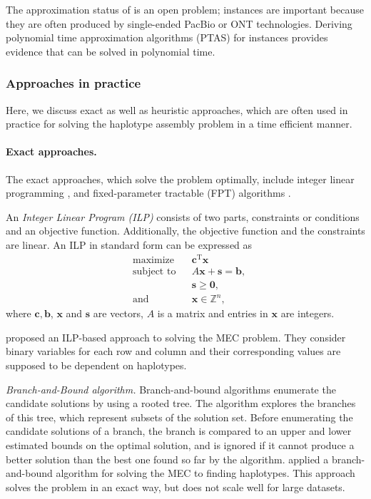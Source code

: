 \begin{gaps}
 The approximation status of \GMEC is an open problem; \GMEC instances are important  because they are often produced by single-ended PacBio or ONT technologies.
 Deriving polynomial time approximation algorithms (PTAS) for \GMEC instances provides evidence that \GMEC can be solved in polynomial time.
 \label{gap:gap1}
\end{gaps}

\subsubsection{Approaches in practice}
Here, we discuss exact as well as heuristic approaches, which are often used in practice for solving the haplotype assembly problem in a time efficient manner.
\paragraph{Exact approaches.} The exact approaches, which solve the problem optimally, include integer linear programming \citep{Fouilhoux2012,CDW13_exact}, and fixed-parameter tractable (FPT) algorithms \citep{he2010optimal,Patterson2015,Pirola2015}.

An \textit{Integer Linear Program (ILP)} consists of two parts, constraints or conditions and an objective function. Additionally, the objective function and the constraints are linear.
An ILP in standard form can be expressed as
\[{\begin{aligned}&{\text{maximize}}&&\mathbf {c} ^{\mathrm {T} }\mathbf {x} \\&{\text{subject to}}&&A\mathbf {x} +\mathbf {s} =\mathbf {b} ,\\&&&\mathbf {s} \geq \mathbf {0} ,\\&{\text{and}}&&\mathbf {x} \in \mathbb {Z} ^{n},\end{aligned}}\]
where $\displaystyle \mathbf {c} ,\mathbf {b} $, $\mathbf {x}$ and $\mathbf {s}$ are vectors, $\displaystyle A $ is a matrix and entries in $\mathbf {x}$ are integers.

\cite{CDW13_exact} proposed an ILP-based approach to solving the MEC problem.
They consider binary variables for each row and column and their corresponding values are supposed to be dependent on haplotypes.

\textit{Branch-and-Bound algorithm.}
Branch-and-bound algorithms enumerate the candidate solutions by using a rooted tree.
The algorithm explores the branches of this tree, which represent subsets of the solution set.
Before enumerating the candidate solutions of a branch, the branch is compared to an upper and lower estimated bounds on the optimal solution, and is ignored if it cannot produce a better solution than the best one found so far by the algorithm.
\cite{wang2005haplotype} applied a branch-and-bound algorithm for solving the MEC to finding haplotypes. This approach solves the problem in an exact way, but does not scale well for large datasets.

